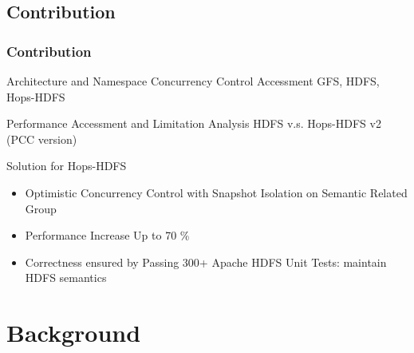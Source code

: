 \documentclass{beamer}
\begin{document}
\subsection{Contribution}
\begin{frame}
\frametitle{Contribution}
\begin{block}{Architecture and Namespace Concurrency Control Accessment}
GFS, HDFS, Hops-HDFS
\end{block}

\begin{block}{Performance Accessment and Limitation Analysis}
HDFS v.s. Hops-HDFS v2 (PCC version)
\end{block}

\begin{block}{Solution for Hops-HDFS}
	\begin{itemize}
		\item Optimistic Concurrency Control with Snapshot Isolation on Semantic Related Group
		\item Performance Increase Up to 70 \%
		\item Correctness ensured by Passing 300+ Apache HDFS Unit Tests: maintain HDFS semantics
	\end{itemize}
\end{block}
\end{frame}

\section{Background}

\end{document}
